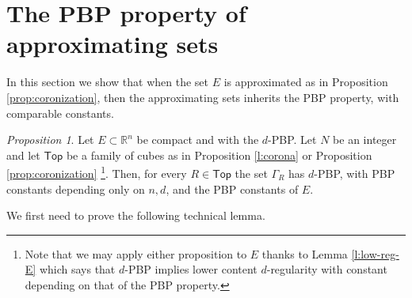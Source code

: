 \documentclass[11pt,reqno]{amsart}
\newcommand{\Top}{\mathsf{Top}}
\theoremstyle{definition}
\theoremstyle{remark}
\numberwithin{equation}{section}
\newcommand{\R}{\mathbb{R}}
\theoremstyle{theorem}
\newtheorem{propo}[theorem]{Proposition}
\theoremstyle{definition}
\theoremstyle{remark}
\numberwithin{equation}{section}
\begin{document}
\section{The PBP property of approximating sets}\label{s:PBP}
In this section we show that when the set $E$ is approximated as in Proposition \ref{prop:coronization}, then the approximating sets inherits the PBP property, with comparable constants. 

	\begin{propo}\label{lem:GammaPBP}
		Let $E \subset \R^n$ be compact and with the $d$-PBP. Let $N$ be an integer and let $\Top$ be a family of cubes as in Proposition \ref{l:corona} or Proposition \ref{prop:coronization} \footnote{Note that we may apply either proposition to $E$ thanks to Lemma \ref{l:low-reg-E} which says that $d$-PBP implies lower content $d$-regularity with constant depending on that of the PBP property.}. Then, for every $R\in\Top$ the set $\Gamma_R$ has $d$-PBP, with PBP constants depending only on $n, d$, and the PBP constants of $E$.
	\end{propo}

We first need to prove the following technical lemma.
 
\end{document}
